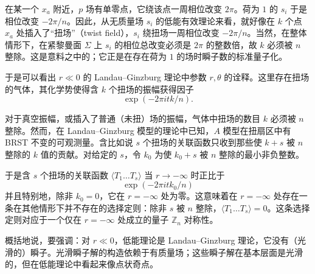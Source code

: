在某一个 $x_a$ 附近，$p$ 场有单零点，它绕该点一周相位改变 $2\pi$。荷为 $1$ 的 $s_i$ 于是相位改变 $-2\pi/n$。因此，从无质量场 $s_i$ 的低能有效理论来看，就好像在 $k$ 个点 $x_a$ 处插入了“扭场”（twist field），$s_i$ 绕扭场一周相位改变 $-2\pi/n$。当然，在整体情形下，在紧黎曼面 $\Sigma$ 上 $s_i$ 的相位总改变必须是 $2\pi$ 的整数倍，故 $k$ 必须被 $n$ 整除。这是意料之中的；它正是在存在荷为 $1$ 的场时瞬子数的标准量子化。

于是可以看出 $r\ll0$ 的 Landau--Ginzburg 理论中参数 $r,\theta$ 的诠释。这里存在扭场的气体，其化学势使得含 $k$ 个扭场的振幅获得因子
\begin{equation}
\exp(-2\pi itk/n).
\tag{3.45}
\end{equation}

对于真空振幅，或插入了普通（未扭）场的振幅，气体中扭场的数目 $k$ 必须被 $n$ 整除。然而，在 Landau--Ginzburg 模型的理论中已知，$A$ 模型在扭扇区中有 BRST 不变的可观测量。含比如说 $s$ 个扭场的关联函数只收到那些使 $k+s$ 被 $n$ 整除的 $k$ 值的贡献。对给定的 $s$，令 $k_0$ 为使 $k_0+s$ 被 $n$ 整除的最小非负整数。

\label{op:40}
于是含 $s$ 个扭场的关联函数 $\langle T_1\ldots T_s\rangle$ 当 $r\to-\infty$ 时正比于
\begin{equation}
\exp(-2\pi itk_0/n)
\tag{3.46}
\end{equation}
并且特别地，除非 $k_0=0$，它在 $r=-\infty$ 处为零。这意味着在 $r=-\infty$ 处存在一条在其他情形下并不存在的选择定则：除非 $s$ 被 $n$ 整除，$\langle T_1\ldots T_s\rangle=0$。这条选择定则对应于一个仅在 $r=-\infty$ 处成立的量子 $\mathbb{Z}_n$ 对称性。

概括地说，要强调：对 $r\ll0$，低能理论是 Landau--Ginzburg 理论，它没有（光滑的）瞬子。光滑瞬子解的构造依赖于有质量场；这些瞬子解在基本层面是光滑的，但在低能理论中看起来像点状奇点。

